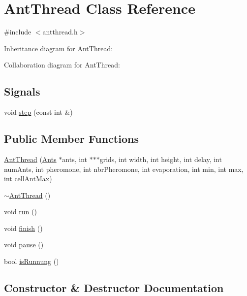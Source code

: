 \hypertarget{classAntThread}{}\section{Ant\+Thread Class Reference}
\label{classAntThread}


{\ttfamily \#include $<$antthread.\+h$>$}



Inheritance diagram for Ant\+Thread\+:


Collaboration diagram for Ant\+Thread\+:
\subsection*{Signals}
\begin{DoxyCompactItemize}
\item 
void \hyperlink{classAntThread_a47a99b29c58316af5d299c088456917e}{step} (const int \&)
\end{DoxyCompactItemize}
\subsection*{Public Member Functions}
\begin{DoxyCompactItemize}
\item 
\hyperlink{classAntThread_a3d99b41d58c04f0db0a5f554e2182717}{Ant\+Thread} (\hyperlink{ant_8h_aec6851c40fb4deaad9f1fdb5b1c5ec28}{Ants} $\ast$ants, int $\ast$$\ast$$\ast$grids, int width, int height, int delay, int num\+Ants, int pheromone, int nbr\+Pheromone, int evaporation, int min, int max, int cell\+Ant\+Max)
\item 
\hyperlink{classAntThread_aaab743ddebd58fab4cc0c5b8f4851f15}{$\sim$\+Ant\+Thread} ()
\item 
void \hyperlink{classAntThread_afe195ea6447effd27d04af6777e33b2d}{run} ()
\item 
void \hyperlink{classAntThread_a13b02a6b99441aa2191161337fa1f138}{finish} ()
\item 
void \hyperlink{classAntThread_a1aee3c02ee018bfed2a7ab48f3b67733}{pause} ()
\item 
bool \hyperlink{classAntThread_ae2f0439c6840a4fd390d095b2c8f0390}{is\+Runnung} ()
\end{DoxyCompactItemize}


\subsection{Constructor \& Destructor Documentation}
\mbox{\label{classAntThread_a3d99b41d58c04f0db0a5f554e2182717}} 
